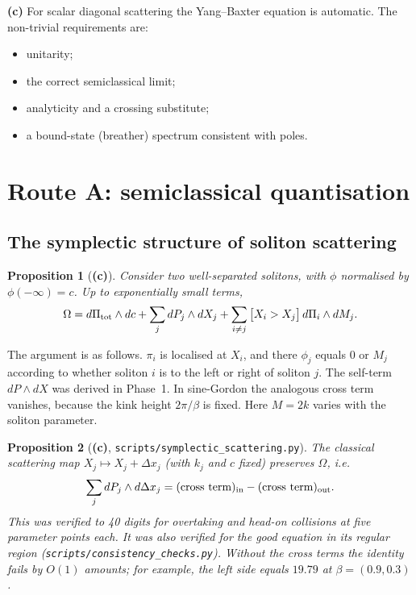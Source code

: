 \documentclass[11pt,a4paper]{article}
\newcommand{\Lc}{\textsf{\textbf{(c)}}\xspace}
\newcommand{\script}[1]{\texttt{scripts/#1}}
\newtheorem{proposition}{Proposition}[section]
\theoremstyle{remark}\newtheorem{remark}[proposition]{Remark}
\begin{document}
\Lc For scalar diagonal scattering the Yang--Baxter equation is automatic. The non-trivial requirements are:
\begin{itemize}
\item unitarity;
\item the correct semiclassical limit;
\item analyticity and a crossing substitute;
\item a bound-state (breather) spectrum consistent with poles.
\end{itemize}

\section{Route A: semiclassical quantisation}\label{sec:A}

\subsection{The symplectic structure of soliton scattering}

\begin{proposition}[\Lc]\label{prop:Omega}
Consider two well-separated solitons, with $\phi$ normalised by $\phi(-\infty)=c$. Up to exponentially small terms,
\[
\Omega=d\Pi_{\rm tot}\wedge dc+\sum_{j}dP_j\wedge dX_j+\sum_{i\ne j}\big[X_i>X_j\big]\,d\Pi_i\wedge dM_j .
\]
\end{proposition}

The argument is as follows. $\pi_i$ is localised at $X_i$, and there $\phi_j$ equals $0$ or $M_j$ according to whether soliton $i$ is to the left or right of soliton $j$. The self-term $dP\wedge dX$ was derived in Phase~1. In sine-Gordon the analogous cross term vanishes, because the kink height $2\pi/\beta$ is fixed. Here $M=2k$ varies with the soliton parameter.

\begin{proposition}[\Lc, \script{symplectic\_\allowbreak scattering.py}]\label{prop:symp}
The classical scattering map $X_j\mapsto X_j+\Delta x_j$ (with $k_j$ and $c$ fixed) preserves $\Omega$, i.e.
\[
\sum_jdP_j\wedge d\Delta x_j=(\text{cross term})_{\rm in}-(\text{cross term})_{\rm out}.
\]
This was verified to 40 digits for overtaking and head-on collisions at five parameter points each. It was also verified for the \emph{good} equation in its regular region (\script{consistency\_\allowbreak checks.py}). Without the cross terms the identity fails by $O(1)$ amounts; for example, the left side equals $19.79$ at $\beta=(0.9,0.3)$.
\end{proposition}
\end{document}
